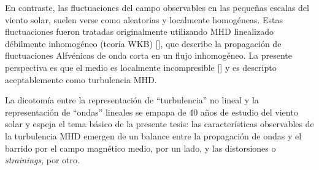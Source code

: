 En contraste, las fluctuaciones del campo observables en las pequeñas
escalas del viento solar, suelen verse como aleatorias y localmente
homogéneas. Estas fluctuaciones fueron tratadas originalmente
utilizando MHD linealizado débilmente inhomogéneo (teoría WKB)
[\cite{parker_dynamical_1965, hollweg_alfven_1973,
  hollweg_transverse_1974, hollweg_transition_1986,
  jacques_momentum_1977, matthaeus_transport_1994}], que describe la
propagación de fluctuaciones Alfv\'enicas de onda corta en un flujo
inhomogéneo. La presente perspectiva es que el medio es localmente
incompresible [\cite{matthaeus_evidence_1990}] y es descripto
aceptablemente como turbulencia MHD.

La dicotomía entre la representación de ``turbulencia'' no lineal y la
representación de ``ondas'' lineales se empapa de 40 años de estudio
del viento solar y espeja el tema básico de la presente tesis: las
características observables de la turbulencia MHD emergen de un
balance entre la propagación de ondas y el barrido por el campo
magnético medio, por un lado, y las distorsiones
o \textit{strainings}, por otro.


